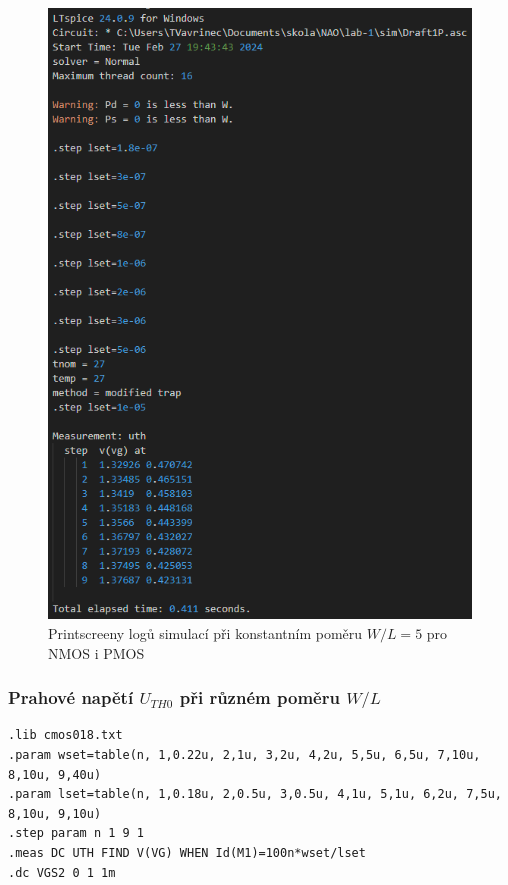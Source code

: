 \begin{figure}[H]
\begin{minipage}{0.5\textwidth}
        \includegraphics[height=0.4\textheight]{log/P-UTH0-WL_const.png}
    \end{minipage}
    \caption{\label{fig:log_NP_WL_const} Printscreeny logů simulací při konstantním poměru \(W/L = 5\) pro NMOS i PMOS}
\end{figure}



\newpage
\subsubsection{Prahové napětí \(U_{TH0}\) při různém poměru \(W/L\)}
\begin{lstlisting}[language=Spice, caption={Použitý kod simulace při různém poměru \(W/L\)}]
.lib cmos018.txt
.param wset=table(n, 1,0.22u, 2,1u, 3,2u, 4,2u, 5,5u, 6,5u, 7,10u, 8,10u, 9,40u)
.param lset=table(n, 1,0.18u, 2,0.5u, 3,0.5u, 4,1u, 5,1u, 6,2u, 7,5u, 8,10u, 9,10u)
.step param n 1 9 1
.meas DC UTH FIND V(VG) WHEN Id(M1)=100n*wset/lset
.dc VGS2 0 1 1m
\end{lstlisting}

